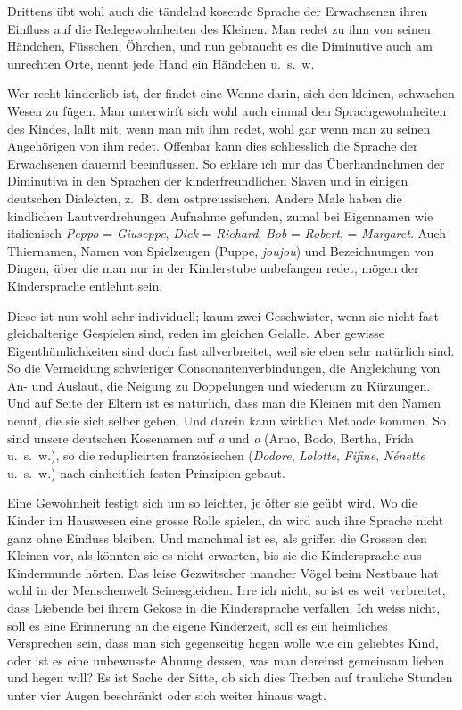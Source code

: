 {Drittens übt wohl auch die tändelnd kosende Sprache der Erwachsenen ihren Einfluss auf die Redegewohnheiten des Kleinen. Man redet zu ihm von seinen Händchen, Füsschen, Öhrchen, und nun gebraucht es die Diminutive auch am unrechten Orte, nennt jede Hand ein Händchen u.~s.~w. 

Wer recht kinderlieb ist, der findet eine Wonne darin, sich den kleinen, schwachen Wesen zu fügen. Man unterwirft sich wohl auch einmal den Sprachgewohnheiten des Kindes, lallt mit, wenn man mit ihm \label{fp.271} redet, wohl gar wenn man zu seinen Angehörigen von ihm redet. Offenbar kann dies schliesslich die Sprache der Erwachsenen dauernd beeinflussen. So erkläre ich mir das Überhandnehmen der Diminutiva in den Sprachen der kinderfreundlichen Slaven und in einigen deutschen Dialekten, z.~B. dem ostpreussischen. Andere Male haben die kindlichen Lautverdrehungen Aufnahme gefunden, zumal bei Eigennamen wie italienisch \textit{Peppo} = \textit{Giuseppe}, \textit{Dick} = \textit{Richard}, \textit{Bob} = \textit{Robert},  = \textit{Margaret}. Auch Thiernamen, Namen von Spielzeugen (Puppe, \textit{joujou}) und Bezeichnungen von Dingen, über die man nur in der Kinderstube unbefangen redet, mögen der Kindersprache entlehnt sein.

Diese ist nun wohl sehr individuell; kaum zwei Geschwister, wenn sie nicht fast gleichalterige Gespielen sind, reden im gleichen Gelalle. Aber gewisse Eigenthümlichkeiten sind doch fast allverbreitet, weil sie eben sehr natürlich sind. So die Vermeidung schwieriger Consonantenverbindungen, die Angleichung von An- und Auslaut, die Neigung zu Doppelungen und wiederum zu Kürzungen. Und auf Seite der Eltern ist es natürlich, dass man die Kleinen mit \label{sp.278} den Namen nennt, die sie sich selber geben. Und darein kann wirklich Methode kommen. So sind unsere deutschen Kosenamen auf \textit{a} und \textit{o} (Arno, Bodo, Bertha, Frida u.~s.~w.), so die reduplicirten französischen (\textit{Dodore}, \textit{Lolotte}, \textit{Fifine}, \textit{Nénette} u.~s.~w.) nach einheitlich festen Prinzipien gebaut.

Eine Gewohnheit festigt sich um so leichter, je öfter sie geübt wird. Wo die Kinder im Hauswesen eine grosse Rolle spielen, da wird auch ihre Sprache nicht ganz ohne Einfluss bleiben. Und manchmal ist es, als griffen die Grossen den Kleinen vor, als könnten sie es nicht erwarten, bis sie die Kindersprache aus Kindermunde hörten. Das leise Gezwitscher mancher Vögel beim Nestbaue hat wohl in der Menschenwelt Seinesgleichen. Irre ich nicht, so ist es weit verbreitet, dass Liebende bei ihrem Gekose in die Kindersprache verfallen. Ich weiss nicht, soll es eine Erinnerung an die eigene Kinderzeit, soll es ein heimliches Versprechen sein, dass man sich gegenseitig hegen wolle wie ein geliebtes Kind, oder ist es eine unbewusste Ahnung dessen, was man dereinst gemeinsam lieben und hegen will? Es ist Sache der Sitte, ob sich dies Treiben auf trauliche Stunden unter vier Augen beschränkt oder sich weiter hinaus wagt.

}
